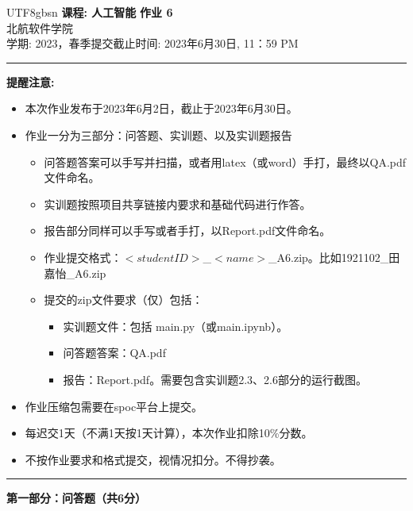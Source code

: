 \documentclass[a4paper, 11pt]{article}
\newenvironment{problem}[2][Q]
    { \begin{mdframed}[backgroundcolor=gray!20] \textbf{#1 #2} \\}
    {  \end{mdframed}}
\begin{document}
\begin{CJK}{UTF8}{gbsn}
\noindent
\large\textbf{课程: 人工智能} \hfill \textbf{作业 6}   \\
北航软件学院 \\
\normalsize 学期: 2023，春季\hfill 提交截止时间:  2023年6月30日, 11：59 PM \\
\noindent\rule{7in}{2.8pt}
\textbf{提醒注意:}
\begin{itemize}
\item 本次作业发布于2023年6月2日，截止于2023年6月30日。
\item 作业一分为三部分：问答题、实训题、以及实训题报告
\begin{itemize}
    \item 问答题答案可以手写并扫描，或者用latex（或word）手打，最终以QA.pdf文件命名。
    \item 实训题按照项目共享链接内要求和基础代码进行作答。
    \item 报告部分同样可以手写或者手打，以Report.pdf文件命名。
    \item 作业提交格式：$<student ID>$\_$<name>$\_A6.zip。比如1921102\_田嘉怡\_A6.zip
    \item 提交的zip文件要求（仅）包括：
    \begin{itemize}
        \item 实训题文件：包括 main.py（或main.ipynb）。
        \item 问答题答案：QA.pdf
        \item 报告：Report.pdf。需要包含实训题2.3、2.6部分的运行截图。
    \end{itemize}
    
\end{itemize}
\item 作业压缩包需要在spoc平台上提交。
\item 每迟交1天（不满1天按1天计算），本次作业扣除10\%分数。
\item 不按作业要求和格式提交，视情况扣分。不得抄袭。
\end{itemize}

\noindent\rule{7in}{1pt}
\textbf{第一部分：问答题（共6分）}


\end{CJK}
\end{document}
